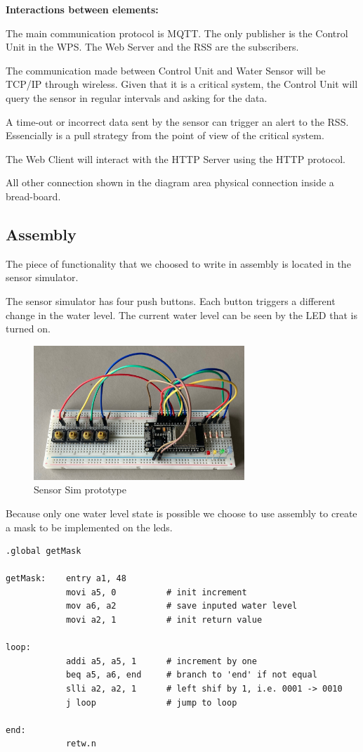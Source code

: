 \documentclass[11pt]{article}
\begin{document}
\textbf{Interactions between elements:}

The main communication protocol is MQTT. The only publisher is the Control Unit in the WPS. The Web Server and the RSS are the subscribers.

The communication made between Control Unit and Water Sensor will be TCP/IP through wireless. Given that it is a critical system, the Control Unit will query the sensor in regular intervals and asking for the data.

A time-out or incorrect data sent by the sensor can trigger an alert to the RSS. Essencially is a pull strategy from the point of view of the critical system.

The Web Client will interact with the HTTP Server using the HTTP protocol.

All other connection shown in the diagram area physical connection inside a bread-board.

\newpage
\subsection{Assembly}

The piece of functionality that we choosed to write in assembly is located in the sensor simulator.

The sensor simulator has four push buttons. Each button triggers a different change in the water level. 
The current water level can be seen by the LED that is turned on.

\begin{figure}[H]
  \centering
  \includegraphics[width=300px]{../diagrams/sensor-sim-01.jpg}
  \caption{Sensor Sim prototype}
  \label{fig:Sensor sim prototype}
\end{figure}

Because only one water level state is possible we choose to use assembly to create a mask to be implemented on the leds.

\begin{verbatim}
.global getMask

getMask:    entry a1, 48
            movi a5, 0          # init increment
            mov a6, a2          # save inputed water level
            movi a2, 1          # init return value

loop: 
            addi a5, a5, 1      # increment by one
            beq a5, a6, end     # branch to 'end' if not equal
            slli a2, a2, 1      # left shif by 1, i.e. 0001 -> 0010
            j loop              # jump to loop 

end:
            retw.n
\end{verbatim}
\end{document}
